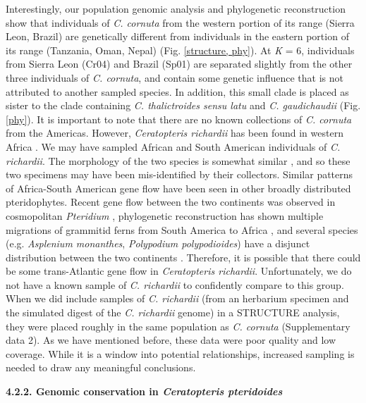 \documentclass[12pt]{article}
\begin{document}
\begin{flushleft}
Interestingly, our population genomic analysis and phylogenetic reconstruction show that individuals of \textit{C. cornuta} from the western portion of its range (Sierra Leon, Brazil) are genetically different from individuals in the eastern portion of its range (Tanzania, Oman, Nepal) (Fig. \ref{structure, phy}). At \textit{K} = 6, individuals from Sierra Leon (Cr04) and Brazil (Sp01) are separated slightly from the other three individuals of \textit{C. cornuta}, and contain some genetic influence that is not attributed to another sampled species. In addition, this small clade is placed as sister to the clade containing \textit{C. thalictroides sensu latu} and \textit{C. gaudichaudii} (Fig. \ref{phy}). It is important to note that there are no known collections of \textit{C. cornuta} from the Americas. However, \textit{Ceratopteris richardii} has been found in western Africa \autocite{LloydTax1974}. We may have sampled African and South American individuals of \textit{C. richardii}. The morphology of the two species is somewhat similar \autocite{LloydTax1974}, and so these two specimens may have been mis-identified by their collectors. Similar patterns of Africa-South American gene flow have been seen in other broadly distributed pteridophytes. Recent gene flow between the two continents was observed in cosmopolitan \textit{Pteridium} \autocite{Wolf2019}, phylogenetic reconstruction has shown multiple migrations of grammitid ferns from South America to Africa \autocite{Sundue2014}, and several species (e.g. \textit{Asplenium monanthes}, \textit{Polypodium polypodioides}) have a disjunct distribution between the two continents \autocite{kornas1993}. Therefore, it is possible that there could be some trans-Atlantic gene flow in \textit{Ceratopteris richardii}. Unfortunately, we do not have a known sample of \textit{C. richardii} to confidently compare to this group. When we did include samples of \textit{C. richardii} (from an herbarium specimen and the simulated digest of the \textit{C. richardii} genome) in a {\small{STRUCTURE}} analysis, they were placed roughly in the same population as \textit{C. cornuta} (Supplementary data 2). As we have mentioned before, these data were poor quality and low coverage. While it is a window into potential relationships, increased sampling is needed to draw any meaningful conclusions. 

\textbf{4.2.2. Genomic conservation in \textit{Ceratopteris pteridoides}}


\end{flushleft}
\end{document}
